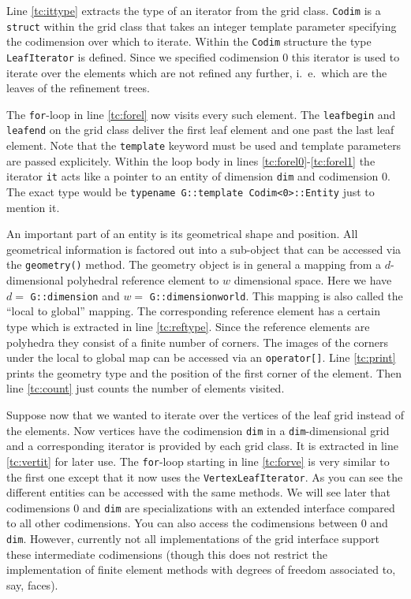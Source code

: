 \documentclass[11pt,a4paper,headinclude,footinclude,DIV16,normalheadings]{scrreprt}
\begin{document}
Line \ref{tc:ittype} extracts the type of an iterator from the grid
class. \lstinline!Codim! is a \lstinline!struct! within the grid class
that takes an integer template parameter specifying the codimension
over which to iterate. Within the \lstinline!Codim! structure the type
\lstinline!LeafIterator! is defined. Since we specified codimension 0
this iterator is used to iterate
over the elements which are not refined any further, i.~e.~which are
the leaves of the refinement trees.

The \lstinline!for!-loop in line \ref{tc:forel} now visits every such
element. The \lstinline!leafbegin! and \lstinline!leafend! on the grid
class deliver the first leaf element and one past the last leaf
element. Note that the \lstinline!template! keyword must be used and
template parameters are passed explicitely. Within the loop body in
lines \ref{tc:forel0}-\ref{tc:forel1} the iterator \lstinline!it! acts
like a pointer to an entity of dimension \lstinline!dim! and
codimension 0. The exact type would be
\lstinline!typename G::template Codim<0>::Entity! just to mention it.

An important part of an entity is its geometrical shape and position.
All geometrical information is factored out into a sub-object that can
be accessed via the \lstinline!geometry()!  method. The geometry
object is in general a mapping from a $d$-dimensional polyhedral
reference element to $w$ dimensional space. Here we have $d=$
\lstinline!G::dimension! and $w=$ \lstinline!G::dimensionworld!. This
mapping is also called the ``local to global'' mapping.  The
corresponding reference element has a certain type which is extracted
in line \ref{tc:reftype}. Since the reference elements are polyhedra
they consist of a finite number of corners. The images of the corners
under the local to global map can be accessed via an
\lstinline!operator[]!. Line \ref{tc:print} prints the geometry type
and the position of the first corner of the element. Then line
\ref{tc:count} just counts the number of elements visited.

Suppose now that we wanted to iterate over the vertices of the leaf
grid instead of the elements. Now vertices have the codimension
\lstinline!dim! in a \lstinline!dim!-dimensional grid and a
corresponding iterator is provided by each grid class. It is extracted
in line \ref{tc:vertit} for later use. The \lstinline!for!-loop
starting in line \ref{tc:forve} is very similar to the first one
except that it now uses the \lstinline!VertexLeafIterator!.  As you
can see the different entities can be accessed with the same methods.
We will see later that codimensions 0 and \lstinline!dim! are
specializations with an extended interface compared to all other
codimensions. You can also access the codimensions between 0 and
\lstinline!dim!. However, currently not all implementations of the
grid interface support these intermediate codimensions (though this
does not restrict the implementation of finite element methods with
degrees of freedom associated to, say, faces).
\end{document}

